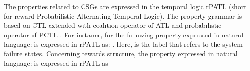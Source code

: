 The properties related to CSGs are expressed in the temporal logic rPATL \cite{hutchisonautomatic2012} (short for reward Probabilistic Alternating Temporal Logic). The property grammar is based on CTL \cite{baierprinciples2008} extended with coalition operator  of ATL \cite{Alur2002} and probabilistic operator  of PCTL \cite{hanssonlogic1994}. For instance, for the following property expressed in natural language:  is expressed in rPATL as: . Here,  is the label that refers to the system failure states. Concerning rewards structure, the property expressed in natural language:  is expressed in rPATL as 

